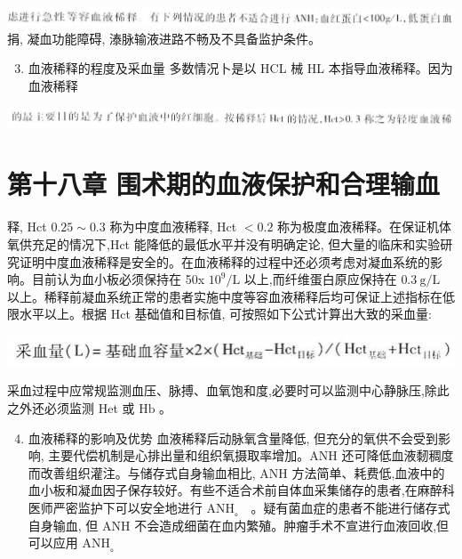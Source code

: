 \documentclass[10pt]{article}
\begin{document}
\includegraphics[max width=\textwidth, center]{2024_07_09_002a177993bd97d1d6d7g-188(1)}\\
捐, 凝血功能障碍, 溙脉输液进路不畅及不具备监护条件。

\begin{enumerate}
  \setcounter{enumi}{2}
  \item 血液稀释的程度及采血量 多数情况卜是以 HCL 械 HL 本指导血液稀释。因为血液稀释
\end{enumerate}

\begin{center}
\includegraphics[max width=\textwidth]{2024_07_09_002a177993bd97d1d6d7g-188}
\end{center}

\section*{第十八章 围术期的血液保护和合理输血}
释, Hct $0.25 \sim 0.3$ 称为中度血液稀释, Hct $<0.2$ 称为极度血液稀释。在保证机体氧供充足的情况下,Hct 能降低的最低水平并没有明确定论, 但大量的临床和实验研究证明中度血液稀释是安全的。在血液稀释的过程中还必须考虑对凝血系统的影响。目前认为血小板必须保持在 50x $10^{9} / \mathrm{L}$ 以上,而纤维蛋白原应保持在 $0.3 \mathrm{~g} / \mathrm{L}$ 以上。稀释前凝血系统正常的患者实施中度等容血液稀释后均可保证上述指标在低限水平以上。根据 Hct 基础值和目标值, 可按照如下公式计算出大致的采血量:

\begin{center}
\includegraphics[max width=\textwidth]{2024_07_09_002a177993bd97d1d6d7g-189}
\end{center}

采血过程中应常规监测血压、脉搏、血氧饱和度,必要时可以监测中心静脉压,除此之外还必须监测 Het 或 $\mathrm{Hb}$ 。

\begin{enumerate}
  \setcounter{enumi}{3}
  \item 血液稀释的影响及优势 血液稀释后动脉氧含量降低, 但充分的氧供不会受到影响, 主要代偿机制是心排出量和组织氧摄取率增加。ANH 还可降低血液䵑稠度而改善组织灌注。与储存式自身输血相比, ANH 方法简单、耗费低,血液中的血小板和凝血因子保存较好。有些不适合术前自体血采集储存的患者,在麻醉科医师严密监护下可以安全地进行 $\mathrm{ANH}_{\text {。 }}$ 。疑有菌血症的患者不能进行储存式自身输血, 但 ANH 不会造成细菌在血内繁殖。肿瘤手术不宣进行血液回收,但可以应用 $\mathrm{ANH}_{\text {。 }}$
\end{enumerate}
\end{document}
